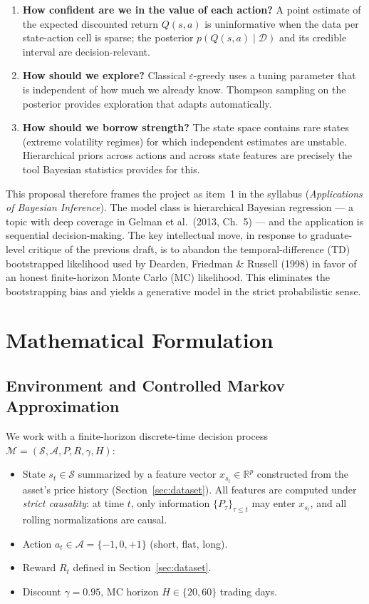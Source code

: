 \documentclass[11pt]{article}
\newcommand{\R}{\mathbb{R}}
\newcommand{\D}{\mathcal{D}}
\begin{document}
\begin{enumerate}[leftmargin=*]
\item \textbf{How confident are we in the value of each action?} A point estimate of the expected discounted return $Q(s,a)$ is uninformative when the data per state-action cell is sparse; the posterior $p(Q(s,a)\mid\D)$ and its credible interval are decision-relevant.
\item \textbf{How should we explore?} Classical $\varepsilon$-greedy uses a tuning parameter that is independent of how much we already know. Thompson sampling on the posterior provides exploration that adapts automatically.
\item \textbf{How should we borrow strength?} The state space contains rare states (extreme volatility regimes) for which independent estimates are unstable. Hierarchical priors across actions and across state features are precisely the tool Bayesian statistics provides for this.
\end{enumerate}

This proposal therefore frames the project as item~1 in the syllabus (\emph{Applications of Bayesian Inference}). The model class is hierarchical Bayesian regression --- a topic with deep coverage in Gelman et al.\ (2013, Ch.\ 5) --- and the application is sequential decision-making. The key intellectual move, in response to graduate-level critique of the previous draft, is to abandon the temporal-difference (TD) bootstrapped likelihood used by Dearden, Friedman \& Russell (1998) in favor of an honest finite-horizon Monte Carlo (MC) likelihood. This eliminates the bootstrapping bias and yields a generative model in the strict probabilistic sense.

\section{Mathematical Formulation}

\subsection{Environment and Controlled Markov Approximation}
\label{sec:mdp}

We work with a finite-horizon discrete-time decision process $\mathcal{M} = (\mathcal{S}, \mathcal{A}, P, R, \gamma, H)$:
\begin{itemize}[leftmargin=*]
\item State $s_t \in \mathcal{S}$ summarized by a feature vector $x_{s_t} \in \R^p$ constructed from the asset's price history (Section~\ref{sec:dataset}). All features are computed under \emph{strict causality}: at time $t$, only information $\{P_\tau\}_{\tau \leq t}$ may enter $x_{s_t}$, and all rolling normalizations are causal.
\item Action $a_t \in \mathcal{A} = \{-1, 0, +1\}$ (short, flat, long).
\item Reward $R_t$ defined in Section~\ref{sec:dataset}.
\item Discount $\gamma = 0.95$, MC horizon $H \in \{20, 60\}$ trading days.
\end{itemize}
\end{document}
